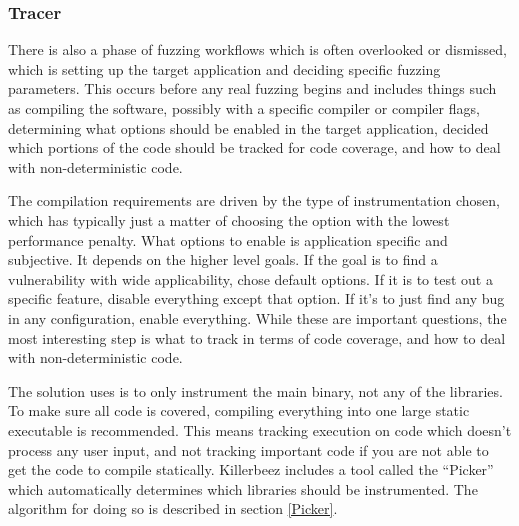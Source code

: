 \begin{multicols}{2}


\subsubsection{Tracer}  \label{Tracer Overview}
There is also a phase of fuzzing workflows which is often overlooked or
dismissed, which is setting up the target application and deciding specific
fuzzing parameters. This occurs before any real fuzzing begins and includes
things such as compiling the software, possibly with a specific compiler or
compiler flags, determining what options should be enabled in the target
application, decided which portions of the code should be tracked for code
coverage, and how to deal with non-deterministic code.

The compilation requirements are driven by the type of instrumentation chosen,
which has typically just a matter of choosing the option with the lowest
performance penalty. What options to enable is application specific and
subjective.  It depends on the higher level goals.  If the goal is to find a
vulnerability with wide applicability, chose default options. If it is to test
out a specific feature, disable everything except that option. If it's to just
find any bug in any configuration, enable everything.  While these are
important questions, the most interesting step is what to track in terms of
code coverage, and how to deal with non-deterministic code.

The solution \AFL{} uses is to only instrument the main binary, not any of the
libraries. To make sure all code is covered, compiling everything into one
large static executable is recommended. This means tracking execution on code
which doesn't process any user input, and not tracking important code if you
are not able to get the code to compile statically. Killerbeez includes a tool
called the ``Picker'' which automatically determines which libraries should be
instrumented.  The algorithm for doing so is described in section \ref{Picker}.


\end{multicols}
